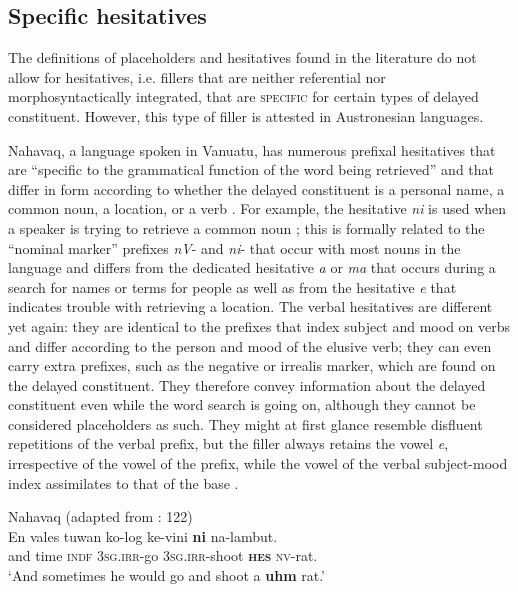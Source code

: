 \documentclass[output=paper]{langscibook}
\begin{document}
\subsection{Specific hesitatives}\label{sec:intro:4.4}

The definitions of placeholders and hesitatives found in the literature do not allow for hesitatives, i.e. fillers that are neither referential nor morphosyntactically integrated, that are \textsc{specific} for certain types of delayed constituent. However, this type of filler is attested in Austronesian languages. 

Nahavaq, a language spoken in Vanuatu, has numerous prefixal hesitatives that are “specific to the grammatical function of the word being retrieved” \citep[120]{Dimock2010} and that differ in form according to whether the delayed constituent is a personal name, a common noun, a location, or a verb \citep[121--127]{Dimock2010}. For example, the hesitative \textit{ni} is used when a speaker is trying to retrieve a common noun ; this is formally related to the “nominal marker” prefixes \textit{nV}- and \textit{ni}- that occur with most nouns in the language and differs from the dedicated hesitative \textit{a} or \textit{ma} that occurs during a search for names or terms for people as well as from the hesitative \textit{e} that indicates trouble with retrieving a location. The verbal hesitatives are different yet again: they are identical to the prefixes that index subject and mood on verbs  and differ according to the person and mood of the elusive verb; they can even carry extra prefixes, such as the negative  or irrealis marker, which are found on the delayed constituent. They therefore convey information about the delayed constituent even while the word search is going on, although they cannot be considered placeholders as such. They might at first glance resemble disfluent repetitions of the verbal prefix, but the filler always retains the vowel \textit{e}, irrespective of the vowel of the prefix, while the vowel of the verbal subject-mood index assimilates to that of the base .

\ea\label{ex:intro:7}
{Nahavaq (adapted from \citealt{Dimock2010}: 122)}\\
\gll En vales tuwan ko-log ke-vini \textbf{ni} na-lambut. \\
     and time \textsc{indf} \textsc{3sg.irr}{}-go \textsc{3sg.irr}{}-shoot \textbf{\textsc{hes}} \textsc{nv}{}-rat.\\
\glt ‘And sometimes he would go and shoot a \textbf{uhm} rat.’  
\z
\end{document}
